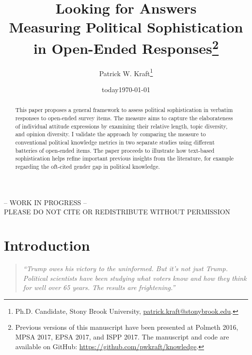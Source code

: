 \documentclass[12pt]{article}
\author{Patrick W. Kraft\footnote{Ph.D. Candidate, Stony Brook University, \href{mailto:patrick.kraft@stonybrook.edu}{patrick.kraft@stonybrook.edu}.
}}
\date{today}
\title{Looking for Answers\\
\large{Measuring Political Sophistication in Open-Ended Responses}\footnote{Previous versions of this manuscript have been presented at Polmeth 2016, MPSA 2017, EPSA 2017, and ISPP 2017.
The manuscript and code are available on GitHub: \url{https://github.com/pwkraft/knowledge}.}
}
\date{\today}
\begin{document}
\maketitle\doublespacing\thispagestyle{empty}

\begin{center}
-- WORK IN PROGRESS -- \\
PLEASE DO NOT CITE OR REDISTRIBUTE WITHOUT PERMISSION
\end{center} 

\hfill
\begin{abstract}\singlespacing
This paper proposes a general framework to assess political sophistication in verbatim responses to open-ended survey items. The measure aims to capture the elaborateness of individual attitude expressions by examining their relative length, topic diversity, and opinion diversity. I validate the approach by comparing the measure to conventional political knowledge metrics in two separate studies using different batteries of open-ended items. The paper proceeds to illustrate how text-based sophistication helps refine important previous insights from the literature, for example regarding the oft-cited gender gap in political knowledge.


\end{abstract}
\hfill
\newpage\setcounter{page}{1}


\section*{Introduction}

\begin{quote}\singlespacing
\textit{``Trump owes his victory to the uninformed. But it's not just Trump. Political scientists have been studying what voters know and how they think for well over 65 years. The results are frightening.''}
\end{quote}
\end{document}
